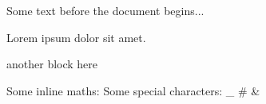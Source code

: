 Some text before the document begins...


    Lorem ipsum dolor sit amet. %


    { another block here }

    Some inline maths: %
    Some special characters: _ # &
    
